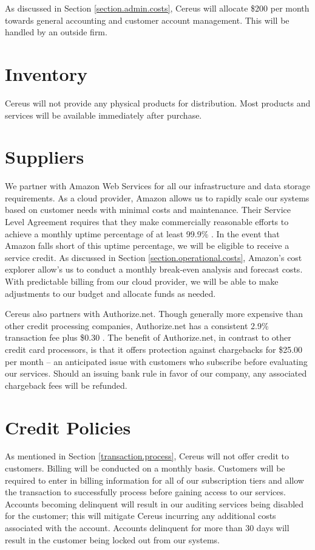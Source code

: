 As discussed in Section \ref{section.admin.costs}, Cereus will allocate \$200 per month towards general accounting and customer account management. This will be handled by an outside firm.

\section{Inventory}

Cereus will not provide any physical products for distribution. Most products and services will be available immediately after purchase.

\section{Suppliers}

We partner with Amazon Web Services for all our infrastructure and data storage requirements. As a cloud provider, Amazon allows us to rapidly scale our systems based on customer needs with minimal costs and maintenance. Their Service Level Agreement requires that they make commercially reasonable efforts to achieve a monthly uptime percentage of at least 99.9\% \cite{amazon.2019}. In the event that Amazon falls short of this uptime percentage, we will be eligible to receive a service credit. As discussed in Section \ref{section.operational.costs}, Amazon's cost explorer allow's us to conduct a monthly break-even analysis and forecast costs. With predictable billing from our cloud provider, we will be able to make adjustments to our budget and allocate funds as needed.

Cereus also partners with Authorize.net. Though generally more expensive than other credit processing companies, Authorize.net has a consistent 2.9\% transaction fee plus \$0.30 \cite{yowana.2019}. The benefit of Authorize.net, in contrast to other credit card processors, is that it offers protection against chargebacks for \$25.00 per month -- an anticipated issue with customers who subscribe before evaluating our services. Should an issuing bank rule in favor of our company, any associated chargeback fees will be refunded.

\section{Credit Policies}

As mentioned in Section \ref{transaction.process}, Cereus will not offer credit to customers. Billing will be conducted on a monthly basis. Customers will be required to enter in billing information for all of our subscription tiers and allow the transaction to successfully process before gaining access to our services. Accounts becoming delinquent will result in our auditing services being disabled for the customer; this will mitigate Cereus incurring any additional costs associated with the account. Accounts delinquent for more than 30 days will result in the customer being locked out from our systems.


